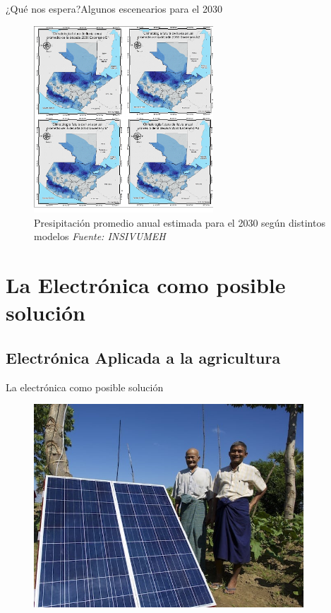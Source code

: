 \documentclass[]{beamer}
\begin{document}
\begin{frame}{¿Qué nos espera?}{Algunos escenearios para el 2030}
  \begin{figure}
     \includegraphics[width=0.6\textwidth]{Docs/Predictions}
    \caption{Presipitación promedio anual estimada para el 2030 según distintos modelos \emph{Fuente: INSIVUMEH}}
    \label{Fig:Lluvias2050}
  \end{figure}
\end{frame}

\section{La Electrónica como posible solución}
\subsection{Electrónica Aplicada a la agricultura}

\begin{frame}{La electrónica como posible solución}
  \begin{figure}
    \includegraphics[width=0.9\textwidth]{Docs/lotus-solar-pump}
  \end{figure}
\end{frame}
\end{document}
